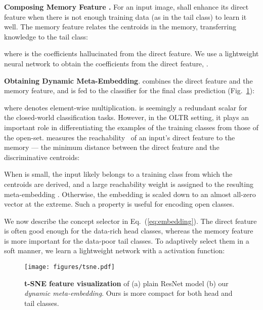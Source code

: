\documentclass[10pt,twocolumn,letterpaper]{article}
\begin{document}
\vspace{2pt}
\noindent
\textbf{Composing Memory Feature .}
For an input image,  shall enhance its direct feature when there is not enough training data (as in the tail class) to learn it well. The memory feature relates the centroids in the memory, transferring knowledge to the tail class:

where  is the coefficients hallucinated from the direct feature. We use a lightweight neural network to obtain the coefficients from the direct feature, .








\vspace{2pt}
\noindent
{\bf Obtaining Dynamic Meta-Embedding}.
   combines the direct feature and the memory feature, and is fed to the classifier for the final class prediction (Fig.~\ref{fig:tsne}):

where  denotes element-wise multiplication.
 is seemingly a redundant scalar for the closed-world classification tasks.  However, in the OLTR setting, it plays an important role in differentiating the examples of the training classes from those of the open-set.
 measures the reachability~\cite{savinov2018episodic} of an input's direct feature  to the memory  --- the minimum distance between the direct feature and the discriminative centroids:

 When  is small, the  input likely belongs to a training class from which the centroids are derived, and a large reachability weight  is assigned to the resulting meta-embedding . Otherwise, the embedding is scaled down to an almost all-zero vector at the extreme.  Such a property is useful for encoding open classes.




We now describe the concept selector  in Eq.~(\ref{eq:embedding}).  The direct feature is often good enough for the data-rich head classes, whereas the memory feature is more important for the data-poor tail classes.  To adaptively select them in a soft manner, we learn a lightweight network  with a  activation function:







\begin{figure}[t]
  \centering
  \texttt{[image: figures/tsne.pdf]}
  \caption{\textbf{t-SNE feature visualization} of (a) plain ResNet model (b) our \emph{dynamic meta-embedding}. Ours is more compact for both head and tail classes. }
  \label{fig:tsne}
\end{figure}
\end{document}
